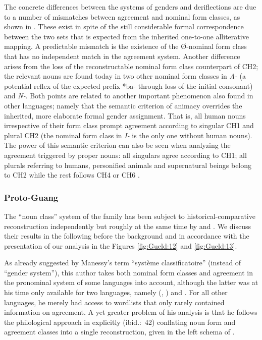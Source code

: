 \documentclass[output=collectionpaper]{langsci/langscibook}
\begin{document}
The concrete differences between the systems of genders and deriflections are due to a number of mismatches between agreement and nominal form classes, as shown in . These exist in spite of the still considerable formal correspondence between the two sets that is expected from the inherited one-to-one alliterative mapping. A predictable mismatch is the existence of the Ø{}-nominal form class that has no independent match in the agreement system. Another difference arises from the loss of the reconstructable nominal form class counterpart of CH2; the relevant nouns are found today in two other nominal form classes in \textit{A-} (a potential reflex of the expected prefix *ba- through loss of the initial consonant) and \textit{N-}. Both points are related to another important phenomenon also found in other  languages; namely that the semantic criterion of animacy overrides the inherited, more elaborate formal gender assignment. That is, all human nouns irrespective of their form class prompt agreement according to singular CH1 and plural CH2 (the nominal form class in \textit{I-} is the only one without human nouns). The power of this semantic criterion can also be seen when analyzing the agreement triggered by proper nouns: all singulars agree according to CH1; all plurals referring to humans, personified animals and supernatural beings belong to CH2 while the rest follows CH4 or CH6 \citep[166]{Hansford1990}.

\subsubsection{Proto-Guang}

The ``noun class'' system of the  family has been subject to historical-comparative reconstruction independently but roughly at the same time by \citet{Manessy1987} and \citet{Snider1988}. We discuss their results in the following before the background and in accordance with the presentation of our  analysis in the Figures \ref{fig:Gueld:12} and \ref{fig:Gueld:13}.

As already suggested by Manessy's term ``système classificatoire'' (instead of ``gender system''), this author takes both nominal form classes and agreement in the pronominal system of some languages into account, although the latter was at his time only available for two languages, namely  (\citealt{Westermann1922}, \citealt{Reineke1966}) and  \citep{Painter1970}. For all other languages, he merely had access to wordlists that only rarely contained information on agreement. A yet greater problem of his analysis is that he follows the philological approach in explicitly (ibid.:~42) conflating noun form and agreement classes into a single  reconstruction, given in the left schema of .
\end{document}
